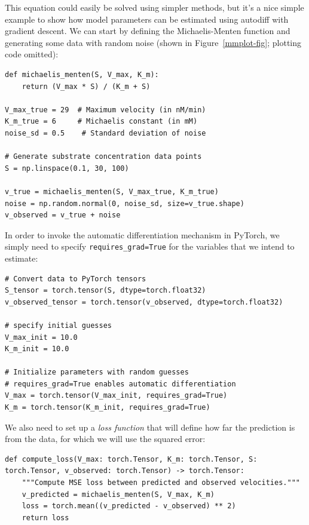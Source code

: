 This equation could easily be solved using simpler methods, but it's a nice simple example to show how model parameters can be estimated using autodiff with gradient descent.  We can start by defining the Michaelis-Menten function and generating some data with random noise (shown in Figure~\ref{mmplot-fig}; plotting code omitted):

\begin{lstlisting}[style=Python]
def michaelis_menten(S, V_max, K_m):
    return (V_max * S) / (K_m + S)

V_max_true = 29  # Maximum velocity (in nM/min)
K_m_true = 6     # Michaelis constant (in mM)
noise_sd = 0.5    # Standard deviation of noise

# Generate substrate concentration data points
S = np.linspace(0.1, 30, 100)  

v_true = michaelis_menten(S, V_max_true, K_m_true)
noise = np.random.normal(0, noise_sd, size=v_true.shape)
v_observed = v_true + noise
\end{lstlisting}

In order to invoke the automatic differentiation mechanism in PyTorch, we simply need to specify \texttt{requires\_grad=True} for the variables that we intend to estimate:

\begin{lstlisting}[style=Python]
# Convert data to PyTorch tensors
S_tensor = torch.tensor(S, dtype=torch.float32)
v_observed_tensor = torch.tensor(v_observed, dtype=torch.float32)

# specify initial guesses
V_max_init = 10.0
K_m_init = 10.0

# Initialize parameters with random guesses
# requires_grad=True enables automatic differentiation
V_max = torch.tensor(V_max_init, requires_grad=True)  
K_m = torch.tensor(K_m_init, requires_grad=True)
\end{lstlisting}

We also need to set up a \textit{loss function} that will define how far the prediction is from the data, for which we will use the squared error:

\begin{lstlisting}[style=Python]
def compute_loss(V_max: torch.Tensor, K_m: torch.Tensor, S: torch.Tensor, v_observed: torch.Tensor) -> torch.Tensor:
    """Compute MSE loss between predicted and observed velocities."""
    v_predicted = michaelis_menten(S, V_max, K_m)
    loss = torch.mean((v_predicted - v_observed) ** 2)
    return loss
\end{lstlisting}

